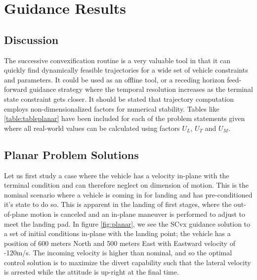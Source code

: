 \chapter{Guidance Results}
\label{results}



\section{Discussion}
The successive convexification routine is a very valuable tool in that it can quickly find dynamically feasible trajectories for a wide set of vehicle constraints and parameters. It could be used as an offline tool, or a receding horizon feed-forward guidance strategy where the temporal resolution increases as the terminal state constraint gets closer. It should be stated that trajectory computation employs non-dimensionalized factors for numerical stability. Tables like \ref{table:tableplanar} have been included for each of the problem statements given where all real-world values can be calculated using factors $U_L$, $U_T$ and $U_M$.


\section{Planar Problem Solutions}
Let us first study a case where the vehicle has a velocity in-plane with the terminal condition and can therefore neglect on dimension of motion. This is the nominal scenario where a vehicle is coming in for landing and has pre-conditioned it's  state to do so. This is apparent in the landing of first stages, where the out-of-plane motion is canceled and an in-plane maneuver is performed to adjust to meet the landing pad. In figure \ref{fig:planar}, we see the SCvx guidance solution to a set of initial conditions in-plane with the landing point; the vehicle has a position of 600 meters North and 500 meters East with Eastward velocity of -120m/s. The incoming velocity is higher than nominal, and so the optimal control solution is to maximize the divert capability such that the lateral velocity is arrested while the attitude is up-right at the final time.


